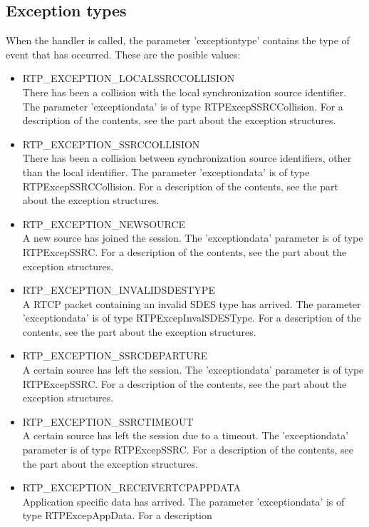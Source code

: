 \subsection{Exception types}

When the handler is called, the parameter 'exceptiontype' contains the type
of event that has occurred. These are the posible values:
\begin{itemize}
	\item RTP\_EXCEPTION\_LOCALSSRCCOLLISION\\
		There has been a collision with the local synchronization
		source identifier. The parameter 'exceptiondata' is of type
		RTPExcepSSRCCollision. For a description of the contents,
		see the part about the exception structures.		
	\item RTP\_EXCEPTION\_SSRCCOLLISION\\
		There has been a collision between synchronization source
		identifiers, other than the local identifier. The parameter
		'exceptiondata' is of type RTPExcepSSRCCollision. For a
		description of the contents, see the part about the exception
		structures.		
	\item RTP\_EXCEPTION\_NEWSOURCE\\
		A new source has joined the session. The 'exceptiondata'
		parameter is of type RTPExcepSSRC. For a description of the
		contents, see the part about the exception structures.
	\item RTP\_EXCEPTION\_INVALIDSDESTYPE\\
		A RTCP packet containing an invalid SDES type has arrived. The
		parameter 'exceptiondata' is of type RTPExcepInvalSDESType. For
		a description of the contents, see the part about the exception
		structures.
	\item RTP\_EXCEPTION\_SSRCDEPARTURE\\
		A certain source has left the session. The 'exceptiondata'
		parameter is of type RTPExcepSSRC. For a description of the
		contents, see the part about the exception structures.
	\item RTP\_EXCEPTION\_SSRCTIMEOUT\\
		A certain source has left the session due to a timeout. The
		'exceptiondata' parameter is of type RTPExcepSSRC. For a
		description of the contents, see the part about the exception
		structures.
	\item RTP\_EXCEPTION\_RECEIVERTCPAPPDATA\\
		Application specific data has arrived. The parameter
		'exceptiondata' is of type RTPExcepAppData. For a description

\end{itemize}
